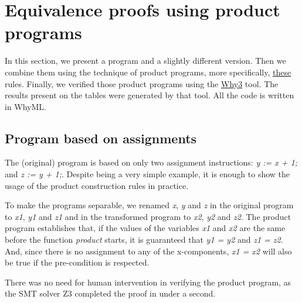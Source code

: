 \section{Equivalence proofs using product programs}
\label{sec:results_eq_proofs_pp}

In this section, we present a program and a slightly different version.
Then we combine them using the technique of product programs, more specifically, \hyperref[fig:product_construction_equal_struct]{these} rules. 
Finally, we verified those product programs using the \hyperref[sec:why3]{Why3} tool.
The results present on the tables were generated by that tool.
All the code is written in WhyML.


\subsection{Program based on assignments}
\label{sub:results_assignments}

The (original) program is based on only two assignment instructions: \emph{y := x + 1;} and \emph{z := y + 1;}.
Despite being a very simple example, it is enough to show the usage of the product construction rules in practice.

To make the programs separable, we renamed \emph{x}, \emph{y} and \emph{z} in the original program to \emph{x1}, \emph{y1} and \emph{z1} and in the transformed program to \emph{x2}, \emph{y2} and \emph{z2}.
The product program establishes that, if the values of the variables \emph{x1} and \emph{x2} are the same before the function \emph{product} starts, it is guaranteed that \emph{y1 = y2} and \emph{z1 = z2}.
And, since there is no assignment to any of the x-components, \emph{x1 = x2} will also be true if the pre-condition is respected.

There was no need for human intervention in verifying the product program, as the SMT solver Z3 completed the proof in under a second.

